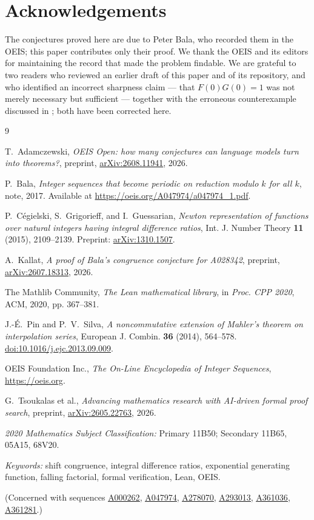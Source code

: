 \documentclass[11pt,a4paper]{article}
\theoremstyle{plain}
\theoremstyle{definition}
\newcommand{\oeis}[1]{\href{https://oeis.org/#1}{\underline{#1}}}
\begin{document}
\section*{Acknowledgements}

The conjectures proved here are due to Peter Bala, who recorded them in the OEIS; this
paper contributes only their proof. We thank the OEIS and its editors for maintaining the
record that made the problem findable. We are grateful to two readers who reviewed an
earlier draft of this paper and of its repository, and who identified an incorrect
sharpness claim --- that $F(0)G(0)=1$ was not merely necessary but sufficient --- together
with the erroneous counterexample discussed in ; both have been corrected
here.

\begin{thebibliography}{9}

T.~Adamczewski,
\emph{OEIS Open: how many conjectures can language models turn into theorems?},
preprint, \href{https://arxiv.org/abs/2608.11941}{arXiv:2608.11941}, 2026.

P.~Bala,
\emph{Integer sequences that become periodic on reduction modulo $k$ for all $k$},
note, 2017. Available at
\url{https://oeis.org/A047974/a047974_1.pdf}.

P.~Cégielski, S.~Grigorieff, and I.~Guessarian,
\emph{Newton representation of functions over natural integers having integral difference
ratios},
Int. J. Number Theory \textbf{11} (2015), 2109--2139.
Preprint: \href{https://arxiv.org/abs/1310.1507}{arXiv:1310.1507}.

A.~Kallat,
\emph{A proof of Bala's congruence conjecture for \textup{A028342}},
preprint, \href{https://arxiv.org/abs/2607.18313}{arXiv:2607.18313}, 2026.

The Mathlib Community,
\emph{The Lean mathematical library},
in \emph{Proc. CPP 2020}, ACM, 2020, pp. 367--381.

J.-É.~Pin and P.~V.~Silva,
\emph{A noncommutative extension of Mahler's theorem on interpolation series},
European J. Combin. \textbf{36} (2014), 564--578.
\href{https://doi.org/10.1016/j.ejc.2013.09.009}{doi:10.1016/j.ejc.2013.09.009}.

OEIS Foundation Inc.,
\emph{The On-Line Encyclopedia of Integer Sequences}, \url{https://oeis.org}.

G.~Tsoukalas et al.,
\emph{Advancing mathematics research with AI-driven formal proof search},
preprint, \href{https://arxiv.org/abs/2605.22763}{arXiv:2605.22763}, 2026.

\end{thebibliography}

\bigskip
\noindent\emph{2020 Mathematics Subject Classification:}
Primary 11B50; Secondary 11B65, 05A15, 68V20.

\medskip
\noindent\emph{Keywords:} shift congruence, integral difference ratios, exponential
generating function, falling factorial, formal verification, Lean, OEIS.

\medskip
\noindent(Concerned with sequences
\oeis{A000262},
\oeis{A047974},
\oeis{A278070},
\oeis{A293013},
\oeis{A361036},
\oeis{A361281}.)
\end{document}
